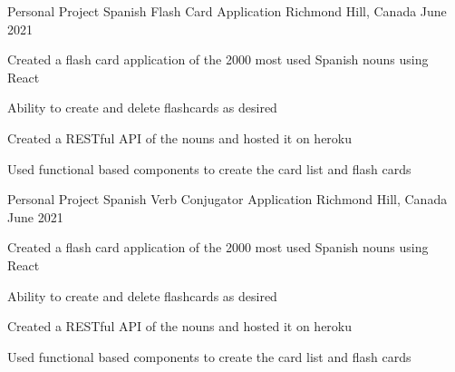 


\begin{cventries}

\cventry
{Personal Project}
{Spanish Flash Card Application}
{Richmond Hill, Canada}
{June 2021}
{ %
\begin{cvitems}
\item {Created a flash card application of the 2000 most used Spanish nouns using React}
\item {Ability to create and delete flashcards as desired}
\item {Created a RESTful API of the nouns and hosted it on heroku}
\item {Used functional based components to create the card list and flash cards}
\end{cvitems}
}

\cventry
{Personal Project}
{Spanish Verb Conjugator Application}
{Richmond Hill, Canada}
{June 2021}
{ %
\begin{cvitems}
\item {Created a flash card application of the 2000 most used Spanish nouns using React}
\item {Ability to create and delete flashcards as desired}
\item {Created a RESTful API of the nouns and hosted it on heroku}
\item {Used functional based components to create the card list and flash cards}
\end{cvitems}
}


\end{cventries}
